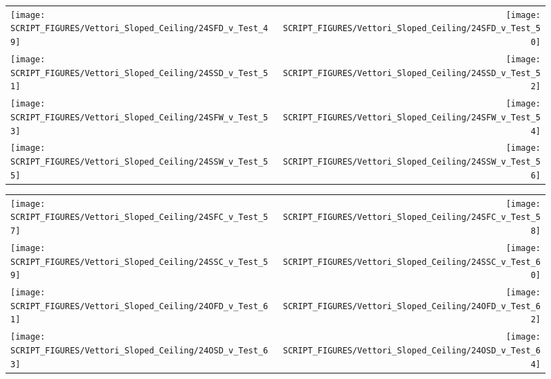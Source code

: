 \begin{figure}[p]
\begin{tabular*}{\textwidth}{l@{\extracolsep{\fill}}r}
\texttt{[image: SCRIPT\_FIGURES/Vettori\_Sloped\_Ceiling/24SFD\_v\_Test\_49]} &
\texttt{[image: SCRIPT\_FIGURES/Vettori\_Sloped\_Ceiling/24SFD\_v\_Test\_50]} \\
\texttt{[image: SCRIPT\_FIGURES/Vettori\_Sloped\_Ceiling/24SSD\_v\_Test\_51]} &
\texttt{[image: SCRIPT\_FIGURES/Vettori\_Sloped\_Ceiling/24SSD\_v\_Test\_52]} \\
\texttt{[image: SCRIPT\_FIGURES/Vettori\_Sloped\_Ceiling/24SFW\_v\_Test\_53]} &
\texttt{[image: SCRIPT\_FIGURES/Vettori\_Sloped\_Ceiling/24SFW\_v\_Test\_54]} \\
\texttt{[image: SCRIPT\_FIGURES/Vettori\_Sloped\_Ceiling/24SSW\_v\_Test\_55]} &
\texttt{[image: SCRIPT\_FIGURES/Vettori\_Sloped\_Ceiling/24SSW\_v\_Test\_56]} \\
\end{tabular*}
\label{Vettori_Sloped_7}
\end{figure}

\begin{figure}[p]
\begin{tabular*}{\textwidth}{l@{\extracolsep{\fill}}r}
\texttt{[image: SCRIPT\_FIGURES/Vettori\_Sloped\_Ceiling/24SFC\_v\_Test\_57]} &
\texttt{[image: SCRIPT\_FIGURES/Vettori\_Sloped\_Ceiling/24SFC\_v\_Test\_58]} \\
\texttt{[image: SCRIPT\_FIGURES/Vettori\_Sloped\_Ceiling/24SSC\_v\_Test\_59]} &
\texttt{[image: SCRIPT\_FIGURES/Vettori\_Sloped\_Ceiling/24SSC\_v\_Test\_60]} \\
\texttt{[image: SCRIPT\_FIGURES/Vettori\_Sloped\_Ceiling/24OFD\_v\_Test\_61]} &
\texttt{[image: SCRIPT\_FIGURES/Vettori\_Sloped\_Ceiling/24OFD\_v\_Test\_62]} \\
\texttt{[image: SCRIPT\_FIGURES/Vettori\_Sloped\_Ceiling/24OSD\_v\_Test\_63]} &
\texttt{[image: SCRIPT\_FIGURES/Vettori\_Sloped\_Ceiling/24OSD\_v\_Test\_64]} \\
\end{tabular*}
\label{Vettori_Sloped_8}
\end{figure}

